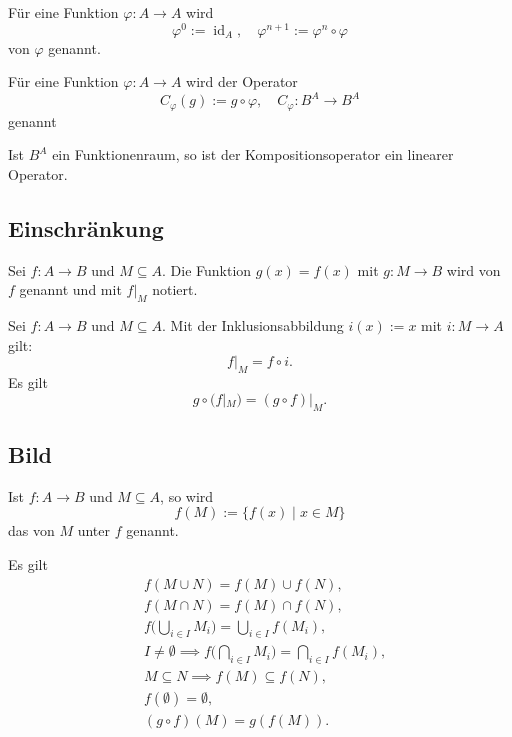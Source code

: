 \begin{Definition}
Für eine Funktion $\varphi\colon A\to A$ wird
\begin{equation}
\varphi^0:=\operatorname{id}_A,\quad \varphi^{n+1}:=\varphi^n\circ\varphi
\end{equation}
 von $\varphi$ genannt.
\end{Definition}
\begin{Definition}
Für eine Funktion $\varphi\colon A\to A$ wird der Operator
\begin{equation}
C_\varphi (g) := g\circ\varphi,\quad C_\varphi\colon B^A\to B^A
\end{equation}
 genannt
\end{Definition}
Ist $B^A$ ein Funktionenraum, so ist der Kompositionsoperator
ein linearer Operator.

\subsection{Einschränkung}
\begin{Definition} Sei $f\colon A\to B$ und $M\subseteq A$.
Die Funktion $g(x)=f(x)$ mit $g\colon M\to B$ wird 
von $f$ genannt und mit $f|_M$ notiert.
\end{Definition}
Sei $f\colon A\to B$ und $M\subseteq A$.
Mit der Inklusionsabbildung $i(x):=x$ mit $i\colon M\to A$ gilt:
\begin{equation}
f|_M = f\circ i.
\end{equation}
Es gilt
\begin{equation}
g\circ (f|_M) = (g\circ f)|_M.
\end{equation}

\subsection{Bild}
\begin{Definition} Ist $f\colon A\to B$ und $M\subseteq A$, so wird
\begin{equation}
f(M) := \{f(x)\mid x\in M\}
\end{equation}
das  von $M$ unter $f$ genannt.
\end{Definition}
Es gilt
\begin{align}
&f(M\cup N) = f(M)\cup f(N),\\
&f(M\cap N) = f(M)\cap f(N),\\
&f\Big(\bigcup_{i\in I}M_i\Big) = \bigcup_{i\in I} f(M_i),\\
&I\ne\emptyset\implies f\Big(\bigcap_{i\in I} M_i\Big) = \bigcap_{i\in I} f(M_i),\\
&M\subseteq N\implies f(M)\subseteq f(N),\\
&f(\emptyset) = \emptyset,\\
&(g\circ f)(M) = g(f(M)).
\end{align}

